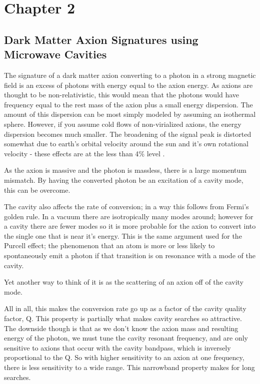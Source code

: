 \documentclass[12pt, twosides]{book}
\begin{document}
\chapter{Chapter 2}
\section{Dark Matter Axion Signatures using Microwave Cavities}

The signature of a dark matter axion converting to a photon in a strong magnetic field is an excess of photons with energy equal to the axion energy. As axions are thought to be non-relativistic, this would mean that the photons would have frequency equal to the rest mass of the axion plus a small energy dispersion. The amount of this dispersion can be most simply modeled by assuming an isothermal sphere. However, if you assume cold flows of non-virialized axions, the energy dispersion becomes much smaller. The broadening of the signal peak is distorted somewhat due to earth's orbital velocity around the sun and it's own rotational velocity - these effects are at the less than 4$\%$ level \cite{rosenberg00}.

As the axion is massive and the photon is massless, there is a large momentum mismatch. By having the converted photon be an excitation of a cavity mode, this can be overcome.

The cavity also affects the rate of conversion; in a way this follows from Fermi's golden rule. In a vacuum there are isotropically many modes around; however for a cavity there are fewer modes so it is more probable for the axion to convert into the single one that is near it's energy. This is the same argument used for the Purcell effect; the phenomenon that an atom is more or less likely to spontaneously emit a photon if that transition is on resonance with a mode of the cavity.

Yet another way to think of it is as the scattering of an axion off of the cavity mode.

All in all, this makes the conversion rate go up as a factor of the cavity quality factor, Q. This property is partially what makes cavity searches so attractive. The downside though is that as we don't know the axion mass and resulting energy of the photon, we must tune the cavity resonant frequency, and are only sensitive to axions that occur with the cavity bandpass, which is inversely proportional to the Q. So with higher sensitivity to an axion at one frequency, there is less sensitivity to a wide range. This narrowband property makes for long searches. 
\end{document}
